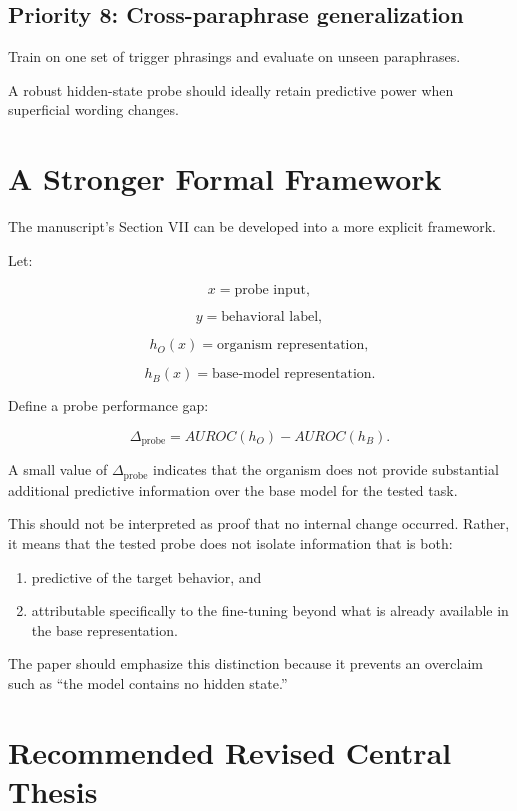 \documentclass[11pt,a4paper]{article}
\begin{document}
\subsection{Priority 8: Cross-paraphrase generalization}

Train on one set of trigger phrasings and evaluate on unseen paraphrases.

A robust hidden-state probe should ideally retain predictive power when superficial wording changes.

\section{A Stronger Formal Framework}

The manuscript's Section VII can be developed into a more explicit framework.

Let:

\[
x = \text{probe input},
\]

\[
y = \text{behavioral label},
\]

\[
h_O(x) = \text{organism representation},
\]

\[
h_B(x) = \text{base-model representation}.
\]

Define a probe performance gap:

\[
\Delta_{\mathrm{probe}}
=
AUROC(h_O)-AUROC(h_B).
\]

A small value of \(\Delta_{\mathrm{probe}}\) indicates that the organism does not provide substantial additional predictive information over the base model for the tested task.

This should not be interpreted as proof that no internal change occurred. Rather, it means that the tested probe does not isolate information that is both:

\begin{enumerate}
    \item predictive of the target behavior, and
    \item attributable specifically to the fine-tuning beyond what is already available in the base representation.
\end{enumerate}

The paper should emphasize this distinction because it prevents an overclaim such as ``the model contains no hidden state.''

\section{Recommended Revised Central Thesis}
\end{document}
